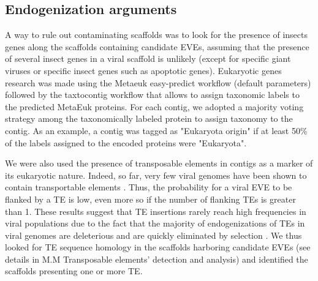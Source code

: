

\subsection{Endogenization arguments}

A way to rule out contaminating scaffolds was to look for the presence of insects genes along the scaffolds containing candidate EVEs, assuming that the presence of several insect genes in a viral scaffold is unlikely (except for specific giant viruses or specific insect genes such as apoptotic genes). Eukaryotic genes research was made using the Metaeuk easy-predict workflow \citep{levy_karin_metaeuksensitive_2020} (default parameters) followed by the taxtocontig workflow that allows to assign taxonomic labels to the predicted MetaEuk proteins. For each contig, we adopted a majority voting strategy among the taxonomically labeled protein to assign taxonomy to the contig. As an example, a contig was tagged as "Eukaryota origin" if at least 50\% of the labels assigned to the encoded proteins were "Eukaryota". 

We were also used the presence of transposable elements in contigs as a marker of its eukaryotic nature. Indeed, so far, very few viral genomes have been shown to contain transportable elements \citep{miller_virus_1982,gilbert_population_2014,gilbert_continuous_2016,gilbert_viruses_2017,loiseau_wide_2020}. Thus, the probability for a viral EVE to be flanked by a TE is low, even more so if the number of flanking TEs is greater than 1. These results suggest that TE insertions rarely reach high frequencies in viral populations due to the fact that the majority of endogenizations of TEs in viral genomes are deleterious and are quickly eliminated by selection \citep{gilbert_continuous_2016, gilbert_viruses_2017}.
We thus looked for TE sequence homology in the scaffolds harboring candidate EVEs (see details in M.M Transposable elements' detection and analysis) and identified the scaffolds presenting one or more TE. 

